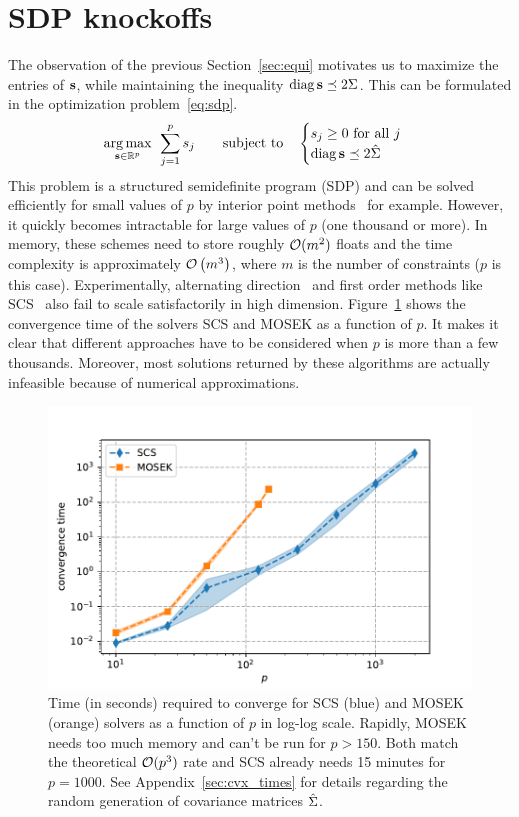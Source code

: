 \section{SDP knockoffs}\label{sec:sdp}

The observation of the previous Section~\ref{sec:equi} motivates us to maximize the entries of $\mathbf{s}$,
while maintaining the inequality $\operatorname*{diag}\mathbf{s} \preceq 2\Sigma$.
This can be formulated in the optimization problem~\ref{eq:sdp}.
\begin{equation}\label{eq:sdp}
    \underset{\mathbf{s} \in \mathbb{R}^p}{\operatorname*{arg\,max}}\;\,
    \sum_{j = 1}^p s_j
    \qquad
    \text{subject to}\quad \begin{cases}
        s_j \geq 0\text{ for all } j\\
        \operatorname*{diag} \mathbf{s} \preceq 2\hat{\Sigma}
    \end{cases}
\end{equation}
This problem is a structured semidefinite program (SDP) and can be solved efficiently for small values of
$p$ by interior point methods~\citep{sdo_todd, sdp_handbook} for example.
However, it quickly becomes intractable for large values of $p$ (one thousand or more).
In memory, these schemes need to store roughly $\mathcal{O}(m^2)$ floats
and the time complexity is approximately $\mathcal{O}\left( m^3 \right)$, where $m$ is the number of constraints
($p$ is this case).
Experimentally, alternating direction~\citep{sdp_admm}
and first order methods like SCS~\citep{sdp_scs} also fail to scale satisfactorily in high dimension.
Figure~\ref{fig:cvx_sdp_times} shows the convergence time of the solvers SCS and MOSEK as a function of $p$.
It makes it clear that different approaches have to be considered when $p$ is more than a few thousands.
Moreover, most solutions returned by these algorithms are actually infeasible because of numerical approximations.
\begin{figure}
    \centering
    \includegraphics[width=0.8\linewidth, height=0.5\linewidth]{figures/cvx_sdp_times.pdf}
    \caption{
        Time (in seconds) required to converge for SCS (blue) and MOSEK (orange) solvers
        as a function of $p$ in log-log scale.
        Rapidly, MOSEK needs too much memory and can't be run for $p > 150$.
        Both match the theoretical $\mathcal{O}(p^3)$ rate and SCS already needs 15 minutes for $p = 1000$.
        See Appendix~\ref{sec:cvx_times} for details regarding the random generation of covariance
        matrices $\hat{\Sigma}$.
    }
    \label{fig:cvx_sdp_times}
\end{figure}

